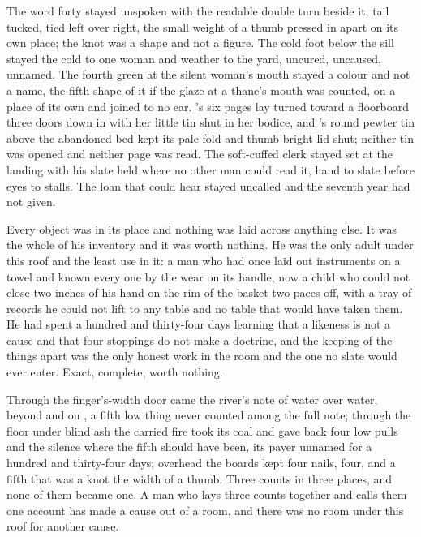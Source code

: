 The word forty stayed unspoken with the readable double turn beside it, tail tucked, tied left over right, the small weight of a thumb pressed in apart on its own place; the knot was a shape and not a figure. The cold foot below the sill stayed the cold to one woman and weather to the yard, uncured, uncaused, unnamed. The fourth green at the silent woman's mouth stayed a colour and not a name, the fifth shape of it if the glaze at a thane's mouth was counted, on a place of its own and joined to no ear. 's six pages lay turned toward a floorboard three doors down in  with her little tin shut in her bodice, and 's round pewter tin above the abandoned bed kept its pale fold and thumb-bright lid shut; neither tin was opened and neither page was read. The soft-cuffed clerk stayed set at the landing with his slate held where no other man could read it, hand to slate before eyes to stalls. The loan that could hear stayed uncalled and the seventh year had not given.

Every object was in its place and nothing was laid across anything else. It was the whole of his inventory and it was worth nothing. He was the only adult under this roof and the least use in it: a man who had once laid out instruments on a towel and known every one by the wear on its handle, now a child who could not close two inches of his hand on the rim of the basket two paces off, with a tray of records he could not lift to any table and no table that would have taken them. He had spent a hundred and thirty-four days learning that a likeness is not a cause and that four stoppings do not make a doctrine, and the keeping of the things apart was the only honest work in the room and the one no slate would ever enter. Exact, complete, worth nothing.

Through the finger's-width door came the river's note of water over water, beyond  and  on , a fifth low thing never counted among the full note; through the floor under blind ash the carried fire took its coal and gave back four low pulls and the silence where the fifth should have been, its payer unnamed for a hundred and thirty-four days; overhead the boards kept four nails, four, and a fifth that was a knot the width of a thumb. Three counts in three places, and none of them became one. A man who lays three counts together and calls them one account has made a cause out of a room, and there was no room under this roof for another cause.

